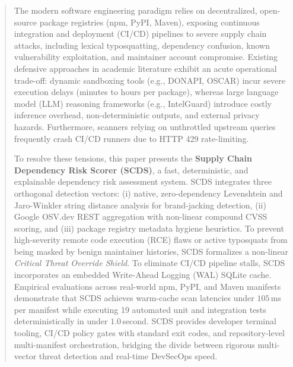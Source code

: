 \begin{abstract}
The modern software engineering paradigm relies on decentralized, open-source package registries (npm, PyPI, Maven), exposing continuous integration and deployment (CI/CD) pipelines to severe supply chain attacks, including lexical typosquatting, dependency confusion, known vulnerability exploitation, and maintainer account compromise. Existing defensive approaches in academic literature exhibit an acute operational trade-off: dynamic sandboxing tools (e.g., DONAPI, OSCAR) incur severe execution delays (minutes to hours per package), whereas large language model (LLM) reasoning frameworks (e.g., IntelGuard) introduce costly inference overhead, non-deterministic outputs, and external privacy hazards. Furthermore, scanners relying on unthrottled upstream queries frequently crash CI/CD runners due to HTTP 429 rate-limiting.

To resolve these tensions, this paper presents the \textbf{Supply Chain Dependency Risk Scorer (SCDS)}, a fast, deterministic, and explainable dependency risk assessment system. SCDS integrates three orthogonal detection vectors: (i) native, zero-dependency Levenshtein and Jaro-Winkler string distance analysis for brand-jacking detection, (ii) Google OSV.dev REST aggregation with non-linear compound CVSS scoring, and (iii) package registry metadata hygiene heuristics. To prevent high-severity remote code execution (RCE) flaws or active typosquats from being masked by benign maintainer histories, SCDS formalizes a non-linear \textit{Critical Threat Override Shield}. To eliminate CI/CD pipeline stalls, SCDS incorporates an embedded Write-Ahead Logging (WAL) SQLite cache. Empirical evaluations across real-world npm, PyPI, and Maven manifests demonstrate that SCDS achieves warm-cache scan latencies under $105$\,ms per manifest while executing 19 automated unit and integration tests deterministically in under $1.0$\,second. SCDS provides developer terminal tooling, CI/CD policy gates with standard exit codes, and repository-level multi-manifest orchestration, bridging the divide between rigorous multi-vector threat detection and real-time DevSecOps speed.
\end{abstract}

